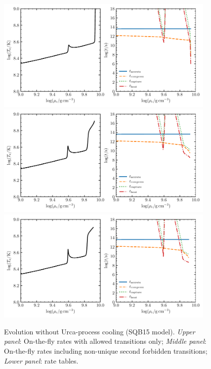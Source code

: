 \documentclass[modern]{aastex62}
\begin{document}
\begin{figure}
  \centering
  \includegraphics[width=0.95\textwidth]{SQB15-allowed.pdf}
  \includegraphics[width=0.95\textwidth]{SQB15-nusf11.pdf}
  \includegraphics[width=0.95\textwidth]{SQB15-suzuki.pdf}

  \caption{Evolution without Urca-process cooling (SQB15 model).  \textit{Upper panel}: On-the-fly rates with allowed transitions only;  \textit{Middle panel}: On-the-fly rates including non-unique second forbidden transitions; \textit{Lower panel}: \citet{Suzuki2016a} rate tables. \label{fig:SQB15}}
\end{figure}
\end{document}
